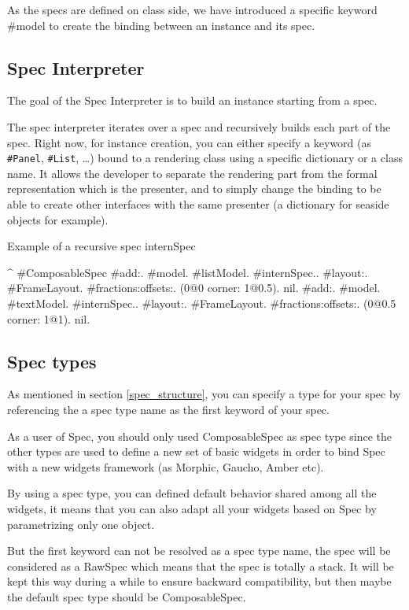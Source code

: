 \documentclass[a4paper,10pt,twoside]{book}
\begin{document}
As the specs are defined on class side, we have introduced a specific keyword \#model to create the binding between an instance and its spec.

\subsection{Spec Interpreter}

The goal of the Spec Interpreter is to build an instance starting from a spec.

The spec interpreter iterates over a spec and recursively builds each part of the spec. Right now, for instance creation, you can either specify a keyword (as \verb+#Panel+, \verb+#List+, \dots) bound to a rendering class using a specific dictionary or a class name. It allows the developer to separate the rendering part from the formal representation which is the presenter, and to simply change the binding to be able to create other interfaces with the same presenter (a dictionary for seaside objects for example).

\begin{method}{Example of a recursive spec}
internSpec

	^ { #ComposableSpec
			#add:. {{#model. #listModel. #internSpec.}.
						#layout:. {#FrameLayout.
									#fractions:offsets:. (0@0 corner: 1@0.5). nil}}.
			#add:. {{#model. #textModel. #internSpec.}.
						#layout:. {#FrameLayout.
									#fractions:offsets:. (0@0.5 corner: 1@1). nil}}}.
\end{method} 

\subsection{Spec types}

As mentioned in section \ref{spec_structure}, you can specify a type for your spec by referencing the a spec type name as the first keyword of your spec.

As a user of Spec, you should only used ComposableSpec as spec type since the other types are used to define a new set of basic widgets in order to bind Spec with a new widgets framework (as Morphic, Gaucho, Amber etc).

By using a spec type, you can defined default behavior shared among all the widgets, it means that you can also adapt all your widgets based on Spec by parametrizing only one object.

But the first keyword can not be resolved as a spec type name, the spec will be considered as a RawSpec which means that the spec is totally a stack. It will be kept this way during a while to ensure backward compatibility, but then maybe the default spec type should be ComposableSpec.
\end{document}
